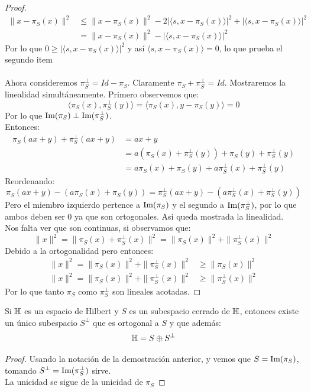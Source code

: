\documentclass[12pt,a4paper]{book}
\begin{document}
\begin{teo}
\begin{proof}
\begin{align*}
\| x - \pi_S(x) \|^2 &\leq \|x- \pi_S(x) \|^2 - 2 |\langle s , x - \pi_S(x) \rangle|^2  + |\langle s , x - \pi_S(x) \rangle|^2 \\
&= \| x - \pi_S(x) \|^2 - |\langle s , x - \pi_S(x) \rangle|^2
\end{align*}
Por lo que $ 0 \geq |\langle s , x - \pi_S(x) \rangle|^2$ y así $\langle s , x - \pi_S(x) \rangle = 0$, lo que prueba el segundo item\\
\\
Ahora consideremos $\pi^{\perp}_S = Id - \pi_S$. Claramente $\pi_S + \pi^{\perp}_S = Id$. Mostraremos la linealidad simultáneamente.
Primero observemos que:
$$ \langle \pi_S(x) , \pi^{\perp}_S(y) \rangle = \langle \pi_S(x), y - \pi_S(y) \rangle = 0$$
Por lo que $\mbox{Im}(\pi_S) \perp \mbox{Im}(\pi^{\perp}_S)$.\\
Entonces:
\begin{align*}
\pi_S(ax+y) + \pi^{\perp}_S(ax+y) &= ax+y  \\
&= a (\pi_S(x)+\pi^{\perp}_S(y)) + \pi_S(y)+ \pi^{\perp}_S(y) \\
&= a\pi_S(x)+\pi_S(y) + a\pi^{\perp}_S(x)+\pi^{\perp}_S(y)
\end{align*}
Reordenando:
$$\pi_S(ax+y)-(a\pi_S(x)+\pi_S(y)) = \pi^{\perp}_S(ax+y) - (a\pi^{\perp}_S(x) + \pi^{\perp}_S(y))$$
Pero el miembro izquierdo pertence a $\mbox{Im}(\pi_S)$ y el segundo a $\mbox{Im}(\pi^{\perp}_S)$, por lo que ambos deben ser 0 ya que son ortogonales. Asi queda mostrada la linealidad. \\
Nos falta ver que son continuas, si observamos que:
$$ \| x \|^2 = \|\pi_S(x) + \pi^{\perp}_S(x) \|^2 = \|\pi_S(x) \|^2 + \|\pi^{\perp}_S(x) \|^2$$
Debido a la ortogonalidad pero entonces:
\begin{align*}
\| x \|^2 = \|\pi_S(x) \|^2 + \|\pi^{\perp}_S(x) \|^2 &\geq \|\pi_S(x) \|^2 \\
\| x \|^2 = \|\pi_S(x) \|^2 + \|\pi^{\perp}_S(x) \|^2 &\geq \|\pi^{\perp}_S(x) \|^2
\end{align*}
Por lo que tanto $\pi_S$ como $\pi^{\perp}_S$ son lineales acotadas.

\end{proof}
\end{teo}
\begin{cor}
Si $\mathbb{H}$ es un espacio de Hilbert y $S$ es un subespacio cerrado de $\mathbb{H}$, entonces existe un único subespacio $S^{\perp}$ que es ortogonal a $S$ y que además: $$ \mathbb{H} = S \oplus S^{\perp}$$
\begin{proof}
Usando la notación de la demostración anterior, y vemos que $S = \mbox{Im}(\pi_S)$, tomando $ S^{\perp} = \mbox{Im}(\pi^{\perp}_S)$ sirve.\\
La unicidad se sigue de la unicidad de $\pi_S$
\end{proof}
\end{cor}
\end{document}
